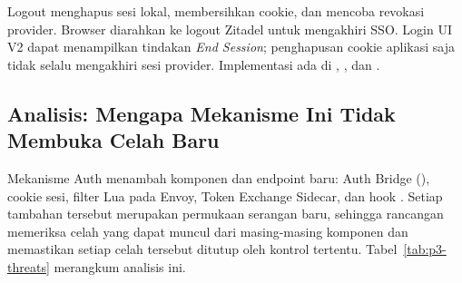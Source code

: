 Logout menghapus sesi lokal, membersihkan cookie, dan mencoba revokasi provider. Browser diarahkan ke logout Zitadel untuk mengakhiri SSO. Login UI V2 dapat menampilkan tindakan \emph{End Session}; penghapusan cookie aplikasi saja tidak selalu mengakhiri sesi provider. Implementasi ada di , , dan .

\subsection{Analisis: Mengapa Mekanisme Ini Tidak Membuka Celah Baru}
Mekanisme Auth menambah komponen dan endpoint baru: Auth Bridge (), cookie sesi, filter Lua pada Envoy, Token Exchange Sidecar, dan hook . Setiap tambahan tersebut merupakan permukaan serangan baru, sehingga rancangan memeriksa celah yang dapat muncul dari masing-masing komponen dan memastikan setiap celah tersebut ditutup oleh kontrol tertentu. Tabel~\ref{tab:p3-threats} merangkum analisis ini.

